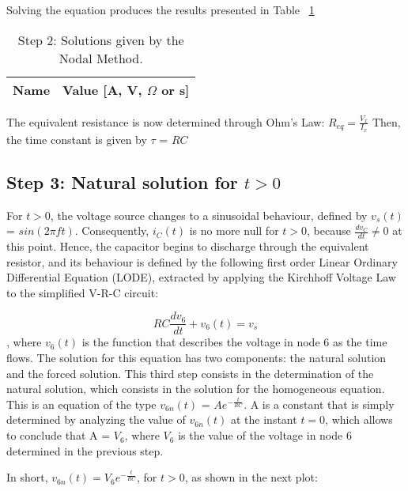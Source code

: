 Solving the equation produces the results presented in Table ~\ref{tab:nodal2}

\FloatBarrier
\begin{table}[h]
	\centering
	\begin{tabular}{|l|r|}
		\hline    
		{\bf Name} & {\bf Value [A, V, $\Omega$ or s]} \\ \hline
		
	\end{tabular}
	\caption{Step 2: Solutions given by the Nodal Method.}
	\label{tab:nodal2}
\end{table}
\FloatBarrier

The equivalent resistance is now determined through Ohm's Law: $R_{eq} = \frac{V_x}{I_x}$       %
Then, the time constant is given by $\tau$ = $RC$        										%




\subsection{Step 3: Natural solution for $t > 0$}

For $t > 0$, the voltage source changes to a sinusoidal behaviour, defined by $v_s(t)$ = $sin(2\pi ft)$. Consequently, $i_C(t)$ is no more null for $t > 0$, because $\frac{dv_C}{dt} \not= 0$ at this point. Hence, the capacitor begins to discharge through the equivalent resistor, and its behaviour is defined by the following first order Linear Ordinary Differential Equation (LODE), extracted by applying the Kirchhoff Voltage Law to the simplified V-R-C circuit:

\begin{equation}
	RC\frac{dv_6}{dt} + v_6(t) = v_s
	\label{eq:kvl2}
\end{equation}
, where $v_6(t)$ is the function that describes the voltage in node 6 as the time flows. The solution for this equation has two components: the natural solution and the forced solution. This third step consists in the determination of the natural solution, which consists in the solution for the homogeneous equation. This is an equation of the type $v_{6n}(t)$ = $Ae^{-\frac{t}{RC}}$. A is a constant that is simply determined by analyzing the value of $v_{6n}(t)$ at the instant $t = 0$, which allows to conclude that A = $V_6$, where $V_6$ is the value of the voltage in node 6 determined in the previous step.

In short, $v_{6n}(t) = V_6e^{-\frac{t}{RC}}$, for $t > 0$, as shown in the next plot:


